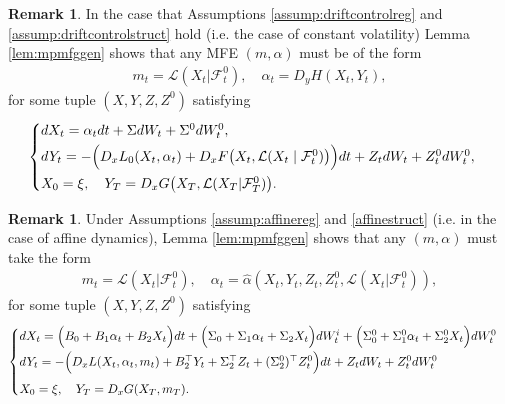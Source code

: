 \documentclass[11pt,reqno]{amsart}
\numberwithin{equation}{section}
\theoremstyle{definition}
\newtheorem{remark}[theorem]{Remark}
\newcommand{\sL}{\mathcal{L}}
\newcommand{\sF}{\mathcal{F}}
\newcommand\cF{\mathcal F}
\newcommand\cL{\mathcal L}
\begin{document}
\begin{remark}
In the case that Assumptions \ref{assump:driftcontrolreg} and \ref{assump:driftcontrolstruct} hold (i.e. the case of constant volatility) Lemma \ref{lem:mpmfggen} shows that any MFE $(m,\alpha)$ must be of the form 
\begin{align*}
    m_t = \sL(X_t | \sF_t^0), \quad \alpha_t = D_y H(X_t, Y_t), 
\end{align*}
for some tuple $(X,Y,Z,Z^0)$ satisfying
\begin{align} \label{eq:mkvfbsdedrift}
  \begin{cases} \vspace{.1cm}
    dX_t = \alpha_t dt + \Sigma dW_t + \Sigma^0 dW_t^0,  \\ \vspace{.1cm}
  dY_t = - \Big(D_x L_0(X_t, \alpha_t) + D_x F\big(X_t, \cL(X_t\mid \cF^0_t)\big) \Big)dt + Z_t  dW_t + Z_t^{0}  dW_t^0, \\
  X_0 = \xi, \quad Y_T = D_x G\big(X_T, \sL(X_T | \cF_T^0)\big).%
\end{cases}
\end{align}
\end{remark}


\begin{remark}
\label{rmk:fbsdeaffinemfe}
Under Assumptions \ref{assump:affinereg} and \ref{affinestruct} (i.e. in the case of affine dynamics), Lemma \ref{lem:mpmfggen} shows that any $(m,\alpha)$ must take the form
\begin{align*}
    m_t = \sL(X_t | \sF_t^0), \quad \alpha_t = \widehat{\alpha}(X_t,Y_t,Z_t,Z_t^0, \sL(X_t | \sF_t^0)), 
\end{align*}
for some tuple $(X,Y,Z,Z^0)$ satisfying
\begin{align} \label{eq:nplayerfbsdeaffinemfe}
  \begin{cases} \vspace{.1cm}
    dX_t = \Big(B_0 + B_1 \alpha_t + B_2 X_t \Big) dt + \Big( \Sigma_0 + \Sigma_1 \alpha_t + \Sigma_2 X_t\Big) dW_t^i + \Big(\Sigma^0_0 + \Sigma^0_1 \alpha_t + \Sigma^0_2 X_t \Big) dW_t^0   \\ \vspace{.1cm}
dY_t = - \Big( D_x L(X_t,\alpha_t, m_t) + B_2^\top Y_t + \Sigma_2^\top Z_t + (\Sigma_2^0)^\top Z_t^0 \Big) dt
+ Z_t  dW_t + Z_t^0  dW_t^0 \vspace{.1cm}  \\
X_0 = \xi, \quad Y_T = D_x G(X_T,m_T).
\end{cases} 
\end{align}
\end{remark}
\end{document}
